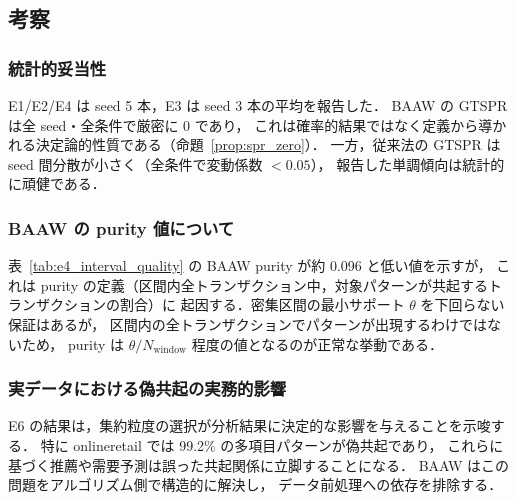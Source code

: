 \subsection{考察}
\label{sec:discussion}

\subsubsection{統計的妥当性}
E1/E2/E4 は seed 5 本，E3 は seed 3 本の平均を報告した．
BAAW の GTSPR は全 seed・全条件で厳密に 0 であり，
これは確率的結果ではなく定義から導かれる決定論的性質である（命題~\ref{prop:spr_zero}）．
一方，従来法の GTSPR は seed 間分散が小さく（全条件で変動係数 $< 0.05$），
報告した単調傾向は統計的に頑健である．

\subsubsection{BAAW の purity 値について}
表~\ref{tab:e4_interval_quality} の BAAW purity が約 0.096 と低い値を示すが，
これは purity の定義（区間内全トランザクション中，対象パターンが共起するトランザクションの割合）に
起因する．密集区間の最小サポート $\theta$ を下回らない保証はあるが，
区間内の全トランザクションでパターンが出現するわけではないため，
purity は $\theta / N_{\text{window}}$ 程度の値となるのが正常な挙動である．

\subsubsection{実データにおける偽共起の実務的影響}
E6 の結果は，集約粒度の選択が分析結果に決定的な影響を与えることを示唆する．
特に onlineretail では 99.2\% の多項目パターンが偽共起であり，
これらに基づく推薦や需要予測は誤った共起関係に立脚することになる．
BAAW はこの問題をアルゴリズム側で構造的に解決し，
データ前処理への依存を排除する．
